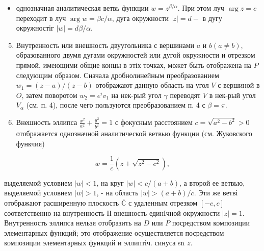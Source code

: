 \documentclass[10pt]{article}
\begin{document}
\begin{itemize}

  \item однозначная аналитическая ветвь функции $w=z^{\beta / \alpha}$. При этом луч $\arg z=c$ переходит в луч $\arg w=\beta c / \alpha$, дуга окружности $|z|=d-$ в дугу окружностіг $|w|=d \beta / \alpha$.

\end{itemize}



\begin{enumerate}

  \setcounter{enumi}{4}

  \item Внутренность или внешность двуугольника с вершинами $a$ и $b(a \neq b)$, образованного двумя дугами окружностей или дугой окружности и отрезком прямой, имеющими общие концы в этіх точках, может быть отображена на $P$ следующим образом. Сначала дробнолинейным преобразованием $w_{1}=(z-a) /(z-b)$ отображают данную область на угол $V$ с вершиной в $O$, затем поворотом $w_{2}=e^{i} v_{1}$ на нек-рый угол $\gamma$ переводят $V$ в нек-рый угол $V_{\alpha}$ (см. п. 4), после чего пользуются преобразованием п. 4 с $\beta=\pi$.



  \item Внешность эллипса $\frac{x^{2}}{a^{2}}+\frac{y^{2}}{b^{2}}=1$ с фокусным расстоянием $c=\sqrt{a^{2}-b^{2}}>0$ отображается однозначной аналитической ветвью функции (см. Жуковского функчия)



\end{enumerate}



\[

w=\frac{1}{c}\left(z+\sqrt{z^{2}-c^{2}}\right),

\]



выделяемой условием $|w|<1$, на круг $|w|<c /(a+b)$, а второй ее ветвью, выделяемой условием $|w|>1$, - на область $|w|>(a+b) / c$. Эти же ветві отображают расширенную плоскость $\overline{\mathbb{C}}$ с удаленным отрезком $[-c, c]$ соответственно на внутренность ІІ внешность единІчной окружности $|z|=1$. Внутренность эллипса нельзя отобразить на $D$ или $P$ посредством композиции элементарных функций; это отображение осуществляется посредством композиции элементарных функций и эллиптіч. синуса sn $z$.
\end{document}
